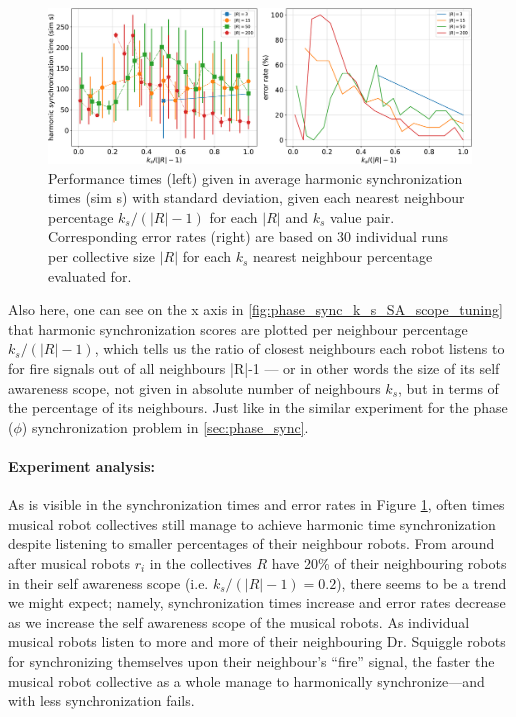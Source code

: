 				\begin{figure}[ht!]
					\centering
					\includegraphics[width=\linewidth]{Assets/DocSegments/Chapters/ExperimentsAndResults/Figures/PerfScores/phase_and_freq_sync_k_s_SA_scope_tuning_experiment_performance.pdf}
					\caption[Experiment results for $\phi$ \& $\omega$ synchronization $k_s$ SA scope tuning experiment.]{Performance times (left) given in average harmonic synchronization times (sim s) with standard deviation, given each nearest neighbour percentage $k_s/(|R|-1)$ for each $|R|$ and $k_s$ value pair. Corresponding error rates (right) are based on 30 individual runs per collective size $|R|$ for each $k_s$ nearest neighbour percentage evaluated for.}
					\label{fig:phase_and_freq_sync_k_s_SA_scope_tuning}
				\end{figure}

				Also here, one can see on the x axis in \ref{fig:phase_sync_k_s_SA_scope_tuning} that harmonic synchronization scores are plotted per neighbour percentage $k_s/(|R|-1)$, which tells us the ratio of closest neighbours each robot listens to for fire signals out of all neighbours |R|-1 — or in other words the size of its self awareness scope, not given in absolute number of neighbours $k_s$, but in terms of the percentage of its neighbours. Just like in the similar experiment for the phase ($\phi$) synchronization problem in \ref{sec:phase_sync}.

				\paragraph{Experiment analysis:\nl}
				
				As is visible in the synchronization times and error rates in Figure \ref{fig:phase_and_freq_sync_k_s_SA_scope_tuning}, often times musical robot collectives still manage to achieve harmonic time synchronization despite listening to smaller percentages of their neighbour robots. From around after musical robots $r_i$ in the collectives $R$ have 20\% of their neighbouring robots in their self awareness scope (i.e. $k_s/(|R|-1)=0.2$), there seems to be a trend we might expect; namely, synchronization times increase and error rates decrease as we increase the self awareness scope of the musical robots. As individual musical robots listen to more and more of their neighbouring Dr. Squiggle robots for synchronizing themselves upon their neighbour's ``fire'' signal, the faster the musical robot collective as a whole manage to harmonically synchronize—and with less synchronization fails.
				
